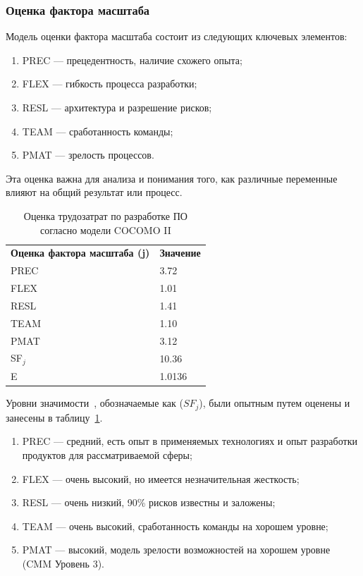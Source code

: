 \subsubsection{Оценка фактора масштаба}

Модель оценки фактора масштаба состоит из следующих ключевых элементов:

\begin{enumerate}
    \item PREC --- прецедентность, наличие схожего опыта;
    \item FLEX --- гибкость процесса разработки;
    \item RESL --- архитектура и разрешение рисков;
    \item TEAM --- сработанность команды;
    \item PMAT --- зрелость процессов.
\end{enumerate}

Эта оценка важна для анализа и понимания того, как различные переменные влияют на общий результат или процесс.

\begin{table}[H]
    \caption{Оценка трудозатрат по разработке ПО согласно модели COCOMO II}
    \centering

    \emergencystretch=10pt
    \begin{tabular}{@{}ll@{}}
        \toprule
        \textbf{Оценка фактора масштаба (j)} & \textbf{Значение} \\
        PREC & 3.72 \\
        FLEX & 1.01 \\
        RESL & 1.41 \\
        TEAM & 1.10 \\
        PMAT & 3.12 \\
        \midrule
        SF$_j$ & 10.36 \\
        E & 1.0136 \\
        \bottomrule
    \end{tabular}
    \label{tab:scale_factor}
\end{table}

Уровни значимости~\cite[c. 22-24]{bib:scale_f}, обозначаемые как ($SF_j$), были опытным путем оценены и занесены в таблицу~\ref{tab:scale_factor}.

\begin{enumerate}
    \item PREC --- средний, есть опыт в применяемых технологиях и опыт разработки продуктов для рассматриваемой сферы;
    \item FLEX --- очень высокий, но имеется незначительная жесткость;
    \item RESL --- очень низкий, 90\% рисков известны и заложены;
    \item TEAM --- очень высокий, сработанность команды на хорошем уровне;
    \item PMAT --- высокий, модель зрелости возможностей на хорошем уровне (CMM Уровень 3).
\end{enumerate}

